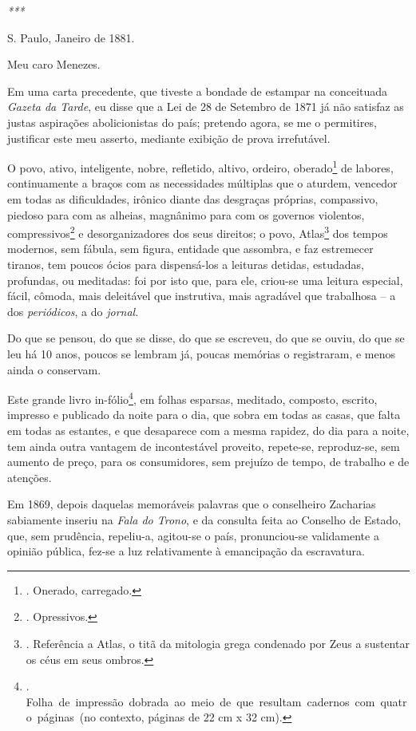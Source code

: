 \emph{***}

S. Paulo, Janeiro de 1881.

Meu caro Menezes.

Em uma carta precedente, que tiveste a bondade de estampar na
conceituada \emph{Gazeta da Tarde}, eu disse que a Lei de 28 de Setembro
de 1871 já não satisfaz as justas aspirações abolicionistas do país;
pretendo agora, se me o permitires, justificar este meu asserto,
mediante exibição de prova irrefutável.

O povo, ativo, inteligente, nobre, refletido, altivo, ordeiro,
oberado\footnote{. Onerado, carregado.} de labores, continuamente a
braços com as necessidades múltiplas que o aturdem, vencedor em todas as
dificuldades, irônico diante das desgraças próprias, compassivo, piedoso
para com as alheias, magnânimo para com os governos violentos,
compressivos\footnote{. Opressivos.} e desorganizadores dos seus
direitos; o povo, Atlas\footnote{. Referência a Atlas, o titã da
  mitologia grega condenado por Zeus a sustentar os céus em seus ombros.}
dos tempos modernos, sem fábula, sem figura, entidade que assombra, e
faz estremecer tiranos, tem poucos ócios para dispensá-los a leituras
detidas, estudadas, profundas, ou meditadas: foi por isto que, para ele,
criou-se uma leitura especial, fácil, cômoda, mais deleitável que
instrutiva, mais agradável que trabalhosa -- a dos \emph{periódicos}, a
do \emph{jornal}.

Do que se pensou, do que se disse, do que se escreveu, do que se ouviu,
do que se leu há 10 anos, poucos se lembram já, poucas memórias o
registraram, e menos ainda o conservam.

Este grande livro in-fólio\footnote{.
  Folha~de~impressão~dobrada~ao~meio~de~que~resultam~cadernos~com~quatro~páginas~(no
  contexto, páginas de 22 cm x 32 cm).}, em folhas esparsas, meditado,
composto, escrito, impresso e publicado da noite para o dia, que sobra
em todas as casas, que falta em todas as estantes, e que desaparece com
a mesma rapidez, do dia para a noite, tem ainda outra vantagem de
incontestável proveito, repete-se, reproduz-se, sem aumento de preço,
para os consumidores, sem prejuízo de tempo, de trabalho e de atenções.

Em 1869, depois daquelas memoráveis palavras que o conselheiro Zacharias
sabiamente inseriu na \emph{Fala do Trono}, e da consulta feita ao
Conselho de Estado, que, sem prudência, repeliu-a, agitou-se o país,
pronunciou-se validamente a opinião pública, fez-se a luz relativamente
à emancipação da escravatura.

